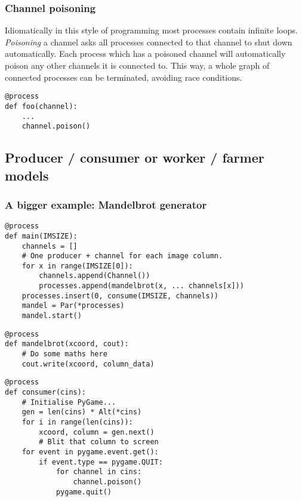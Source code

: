 \documentclass{beamer}
\begin{document}
\begin{frame}[fragile]
  \frametitle{Channel poisoning}
  \begin{definition}
    Idiomatically in this style of programming most processes contain
    infinite loops. \emph{Poisoning} a channel asks all processes
    connected to that channel to shut down automatically. Each process
    which has a poisoned channel will automatically poison any other
    channels it is connected to. This way, a whole graph of connected
    processes can be terminated, avoiding race conditions.
  \end{definition}
  \begin{lstlisting}[language=python_new]
@process
def foo(channel):
    ...
    channel.poison()
  \end{lstlisting}
\end{frame}


\subsection{Producer / consumer or worker / farmer models}


\frame
{
  \frametitle{A bigger example: Mandelbrot generator}
}


\begin{frame}[fragile]
\begin{lstlisting}[language=python_new]
@process
def main(IMSIZE):
    channels = []
    # One producer + channel for each image column.
    for x in range(IMSIZE[0]): 
        channels.append(Channel())
        processes.append(mandelbrot(x, ... channels[x]))
    processes.insert(0, consume(IMSIZE, channels))
    mandel = Par(*processes)
    mandel.start()
\end{lstlisting}
\end{frame}

\begin{frame}[fragile]
\begin{lstlisting}[language=python_new]
@process
def mandelbrot(xcoord, cout):
    # Do some maths here
    cout.write(xcoord, column_data)
\end{lstlisting}
\end{frame}


\begin{frame}[fragile]
\begin{lstlisting}[language=python_new]
@process
def consumer(cins):
    # Initialise PyGame...
    gen = len(cins) * Alt(*cins)
    for i in range(len(cins)):
        xcoord, column = gen.next()
        # Blit that column to screen
    for event in pygame.event.get():
        if event.type == pygame.QUIT:
            for channel in cins: 
                channel.poison()
            pygame.quit()
\end{lstlisting}
\end{frame}
\end{document}
